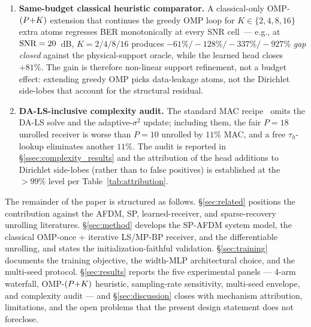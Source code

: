 \begin{enumerate}[leftmargin=1.3em,itemsep=2pt]
\item \textbf{Same-budget classical heuristic comparator.} A
classical-only OMP-$(P{+}K)$ extension that continues the greedy
OMP loop for $K\in\{2,4,8,16\}$ extra atoms regresses BER monotonically
at every SNR cell~--- e.g., at $\mathrm{SNR}=20$~dB, $K{=}2/4/8/16$ produces
$-61\%/-128\%/-337\%/-927\%$ \emph{gap closed} against the
physical-support oracle, while the learned head closes $+81\%$.
The gain is therefore non-linear support refinement, not a budget
effect: extending greedy OMP picks data-leakage atoms, not the
Dirichlet side-lobes that account for the structural residual.

\item \textbf{DA-LS-inclusive complexity audit.} The standard MAC
recipe~\cite{he2020modeldrivenmimo} omits the DA-LS solve and the
adaptive-$\sigma^2$ update; including them, the fair $P=18$ unrolled
receiver is worse than $P=10$ unrolled by $11\%$ MAC, and a free
$\tau_h$-lookup eliminates another $11\%$. The audit is reported in
\S\ref{ssec:complexity_results} and the attribution of the head
additions to Dirichlet side-lobes (rather than to false positives) is
established at the $>99\%$ level per Table~\ref{tab:attribution}.
\end{enumerate}

The remainder of the paper is structured as follows. \S\ref{sec:related}
positions the contribution against the AFDM, SP, learned-receiver, and
sparse-recovery unrolling literatures. \S\ref{sec:method} develops the
SP-AFDM system model, the classical OMP-once + iterative LS/MP-BP
receiver, and the differentiable unrolling, and states the
initialization-faithful validation. \S\ref{sec:training} documents the
training objective, the width-MLP architectural choice, and the
multi-seed protocol. \S\ref{sec:results} reports the five experimental
panels --- 4-arm waterfall, OMP-$(P{+}K)$ heuristic, sampling-rate
sensitivity, multi-seed envelope, and complexity audit ---
and \S\ref{sec:discussion} closes with mechanism attribution, limitations,
and the open problems that the present design statement does not
foreclose.
